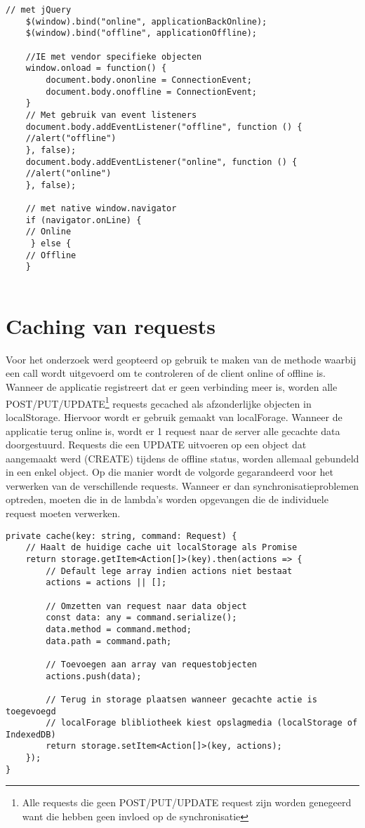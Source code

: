 \begin{lstlisting}[caption=Verschillende methodes\autocite{offline-online-examples} voor controleren offline en online status.]
    // met jQuery
    $(window).bind("online", applicationBackOnline); 
    $(window).bind("offline", applicationOffline);

    //IE met vendor specifieke objecten
    window.onload = function() {
        document.body.ononline = ConnectionEvent;
        document.body.onoffline = ConnectionEvent;
    }
    // Met gebruik van event listeners
    document.body.addEventListener("offline", function () {
    //alert("offline")
    }, false);
    document.body.addEventListener("online", function () {
    //alert("online")
    }, false);
    
    // met native window.navigator
    if (navigator.onLine) {
  	// Online
     } else {
  	// Offline
	}
    
\end{lstlisting}
\clearpage
\section{Caching van requests}
Voor het onderzoek werd geopteerd op gebruik te maken van de methode waarbij een call wordt uitgevoerd om te controleren of de client online of offline is. Wanneer de applicatie registreert dat er geen verbinding meer is, worden alle POST/PUT/UPDATE\footnote{Alle requests die geen POST/PUT/UPDATE request zijn worden genegeerd want die hebben geen invloed op de synchronisatie} requests gecached als afzonderlijke objecten in localStorage. Hiervoor wordt er gebruik gemaakt van localForage. Wanneer de applicatie terug online is, wordt er 1 request naar de server alle gecachte data doorgestuurd. Requests die een UPDATE uitvoeren op een object dat aangemaakt werd (CREATE) tijdens de offline status, worden allemaal gebundeld in een enkel object. Op die manier wordt de volgorde gegarandeerd voor het verwerken van de verschillende requests. Wanneer er dan synchronisatieproblemen optreden, moeten die in de lambda's worden opgevangen die de individuele request moeten verwerken.

\begin{lstlisting}[caption=Caching van een request]
private cache(key: string, command: Request) {
	// Haalt de huidige cache uit localStorage als Promise
	return storage.getItem<Action[]>(key).then(actions => {
		// Default lege array indien actions niet bestaat
		actions = actions || [];
	
		// Omzetten van request naar data object
		const data: any = command.serialize();
		data.method = command.method;
		data.path = command.path;
		
		// Toevoegen aan array van requestobjecten
		actions.push(data);
		
		// Terug in storage plaatsen wanneer gecachte actie is toegevoegd
		// localForage blibliotheek kiest opslagmedia (localStorage of IndexedDB)
		return storage.setItem<Action[]>(key, actions);
	});
}
\end{lstlisting}

